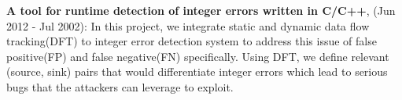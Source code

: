 \documentclass[10pt,a4]{article}
\begin{document}
\begin{small}
\begin{itemize}
%

  {\bf A tool for runtime detection of integer errors written in C/C++}, (Jun
  2012 - Jul 2002): In this project, we integrate static and dynamic data flow
  tracking(DFT) to integer error detection system to address this issue of false
  positive(FP) and false negative(FN) specifically. Using DFT, we define
  relevant (source, sink) pairs that would differentiate integer errors which
  lead to serious bugs that the attackers can leverage to exploit. \\
  

\end{itemize}


\end{small}
\end{document}
